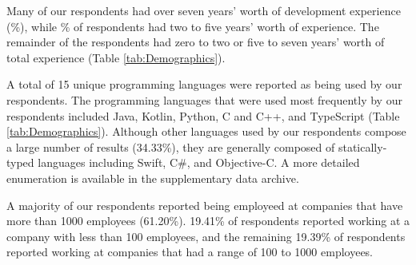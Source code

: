 \par Many of our respondents had over seven years' worth of development 
experience (\sevenPlus{}\%), while \twoToFive\% of respondents had two to five 
years' worth of experience. 
The remainder of the respondents had zero to two or five to seven years' worth
of total experience (Table \ref{tab:Demographics}).

\par A total of 15 unique programming languages were reported as being used by
our respondents.
The programming languages that were used most frequently by our
respondents included Java, Kotlin, Python, C and C++, and TypeScript (Table
\ref{tab:Demographics}). 
Although other languages used by our respondents compose a large number of 
results (34.33\%), they are generally composed of statically-typed languages
including Swift, C\#, and Objective-C.
A more detailed enumeration is available in the supplementary data archive.

\par A majority of our respondents reported being employeed at companies that
have more than 1000 employees (61.20\%).
19.41\% of respondents reported working at a company with less than 100
employees, and the remaining 19.39\% of respondents reported working at
companies that had a range of 100 to 1000 employees.

